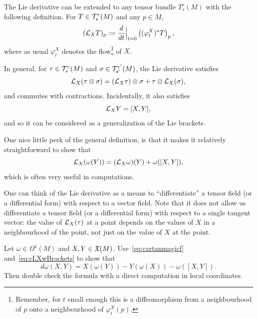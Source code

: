 \begin{remark}
	The Lie derivative can be extended to any tensor bundle $T_s^r(M)$ with the following definition.
	For $T\in\mathcal{T}_s^r(M)$ and any $p\in M$,
	\begin{equation}
		(\mathcal{L}_X T)_p := \frac{d}{dt}\Big|_{t=0}\left((\varphi_t^X)^* T\right)_p,
	\end{equation}
	where as usual $\varphi_t^X$ denotes the flow\footnote{Remember, for $t$ small enough this is a diffeomorphism from a neighbourhood of $p$ onto a neighbourhood of $\varphi_t^X(p)$.} of $X$.

	In general, for $\tau\in\mathcal{T}_s^r(M)$ and $\sigma\in\mathcal{T}_{s'}^{r'}(M)$, the Lie derivative satisfies
	\begin{equation}
		\mathcal{L}_X(\tau\otimes\sigma) = (\mathcal{L}_X\tau)\otimes\sigma + \tau\otimes\mathcal{L}_X(\sigma),
	\end{equation}
	and commutes with contractions.
	Incidentally, it also satisfies
	\begin{equation}
		\mathcal{L}_XY = [X,Y],
	\end{equation}
	and so it can be considered as a generalization of the Lie brackets.

	One nice little perk of the general definition, is that it makes it relatively straightforward to show that
	\begin{equation}\label{eq:cLXwBrackets}
		\mathcal{L}_X(\omega(Y)) = (\mathcal{L}_X\omega)(Y) + \omega([X,Y]),
	\end{equation}
	which is often very useful in computations.

	One can think of the Lie derivative as a means to ``differentiate'' a tensor field (or a differential form) with respect to a vector field.
	Note that it does not allow us differentiate a tensor field (or a differential form) with respect to a single tangent vector: the value of $\mathcal{L}_X(\tau)$ at a point depends on the values of $X$ in a neighbourhood of the point, not just on the value of $X$ at the point.
\end{remark}

\begin{exercise}\label{exe:dinvariant}
	Let $\omega\in\Omega^1(M)$ and $X,Y\in\mathfrak{X}(M)$.
	Use~\eqref{eq:cartanmagicf} and~\eqref{eq:cLXwBrackets} to show that
	\begin{equation}
		d\omega(X,Y) = X(\omega(Y)) - Y(\omega(X)) - \omega([X,Y]).
	\end{equation}
	Then double check the formula with a direct computation in local coordinates.
\end{exercise}

